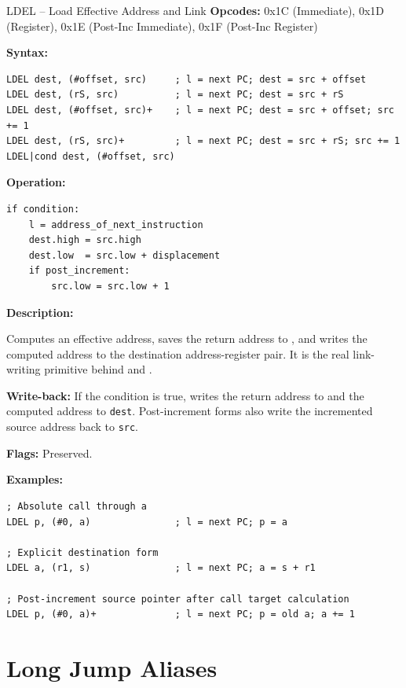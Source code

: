\begin{instructionbox}{LDEL -- Load Effective Address and Link}
	\textbf{Opcodes:} 0x1C (Immediate), 0x1D (Register), 0x1E (Post-Inc Immediate), 0x1F (Post-Inc Register)

	\textbf{Syntax:}
	\begin{lstlisting}
LDEL dest, (#offset, src)     ; l = next PC; dest = src + offset
LDEL dest, (rS, src)          ; l = next PC; dest = src + rS
LDEL dest, (#offset, src)+    ; l = next PC; dest = src + offset; src += 1
LDEL dest, (rS, src)+         ; l = next PC; dest = src + rS; src += 1
LDEL|cond dest, (#offset, src)
\end{lstlisting}

	\textbf{Operation:}
	\begin{verbatim}
if condition:
    l = address_of_next_instruction
    dest.high = src.high
    dest.low  = src.low + displacement
    if post_increment:
        src.low = src.low + 1
\end{verbatim}

	\textbf{Description:}

	Computes an effective address, saves the return address to , and writes the computed address to the destination
	address-register pair. It is the real link-writing primitive behind  and .

	\textbf{Write-back:} If the condition is true, writes the return address to  and the computed address to
	\texttt{dest}. Post-increment forms also write the incremented source address back to \texttt{src}.

	\textbf{Flags:} Preserved.

	\textbf{Examples:}
	\begin{lstlisting}
; Absolute call through a
LDEL p, (#0, a)               ; l = next PC; p = a

; Explicit destination form
LDEL a, (r1, s)               ; l = next PC; a = s + r1

; Post-increment source pointer after call target calculation
LDEL p, (#0, a)+              ; l = next PC; p = old a; a += 1
\end{lstlisting}

\end{instructionbox}

\section{Long Jump Aliases}


